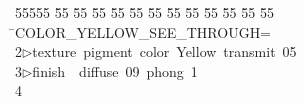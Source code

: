 %
%
\begin{tabbing}
55555 \= 55 \= 55 \= 55 \= 55 \= 55 \= 55 \= 55 \= 55 \= 55 \= 55 \= 55 \= 55 \= \>COLOR\_YELLOW\_SEE\_THROUGH=\\[0pt]
2\>$\triangleright$\>texture\ pigment\ color\ Yellow\ transmit\ 05\ \ \\[0pt]
3\>$\triangleright$\>finish\ \ diffuse\ 09\ phong\ 1\\[0pt]
4\>\end{tabbing}
